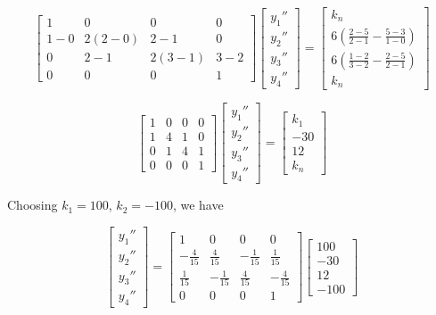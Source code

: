 \documentclass[11pt]{article} %
\begin{document}
$$\begin{bmatrix} 1 & 0 & 0 & 0 \\ 1 - 0 & 2(2 -0) &2 -1 & 0 
		 \\ 0 & 2 - 1 & 2(3 -1) & 3 - 2 \\ 0 & 0 & 0 & 1
\end{bmatrix}
\begin{bmatrix} y_1'' \\ y_2'' \\ y_3'' \\ y_4'' \end{bmatrix} = 
\begin{bmatrix} k_n \\  6\left( \frac{2 - 5}{2 - 1} - \frac{5-3}{1 - 0} \right) \\ 
			 6\left( \frac{1 - 2}{3 - 2} - \frac{2-5}{2 - 1} \right) \\ k_n\end{bmatrix}$$

$$\begin{bmatrix} 1 & 0 & 0 & 0 \\ 1 & 4 &1 & 0 
		 \\ 0 & 1 & 4 & 1 \\ 0 & 0 & 0 & 1
\end{bmatrix}
\begin{bmatrix} y_1'' \\ y_2'' \\ y_3'' \\ y_4'' \end{bmatrix} = 
\begin{bmatrix} k_1 \\ -30 \\ 12 \\ k_n\end{bmatrix}$$

Choosing $k_1 = 100$, $k_2 = -100$, we have 

$$
\begin{bmatrix} y_1'' \\ y_2'' \\ y_3'' \\ y_4'' \end{bmatrix} = 
\begin{bmatrix} 1 & 0 & 0 & 0 \\ -\frac{4}{15} & \frac{4}{15} & -\frac{1}{15} & \frac{1}{15} 
		 \\  \frac{1}{15} & -\frac{1}{15} & \frac{4}{15} & -\frac{4}{15} \\ 0 & 0 &0 & 1
\end{bmatrix}
\begin{bmatrix} 100 \\ -30 \\ 12 \\ -100\end{bmatrix}$$
\end{document}
